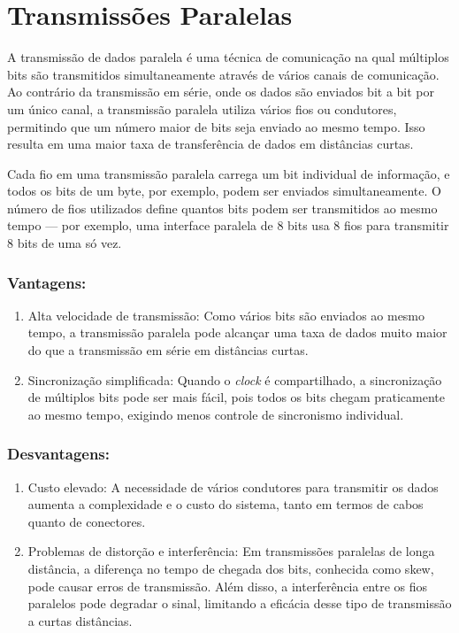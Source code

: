\documentclass[12pt]{article}
\begin{document}
\section{Transmissões Paralelas}
A transmissão de dados paralela é uma técnica de comunicação na qual múltiplos bits são transmitidos simultaneamente através de vários canais de comunicação. Ao contrário da transmissão em série, onde os dados são enviados bit a bit por um único canal, a transmissão paralela utiliza vários fios ou condutores, permitindo que um número maior de bits seja enviado ao mesmo tempo. Isso resulta em uma maior taxa de transferência de dados em distâncias curtas.

Cada fio em uma transmissão paralela carrega um bit individual de informação, e todos os bits de um byte, por exemplo, podem ser enviados simultaneamente. O número de fios utilizados define quantos bits podem ser transmitidos ao mesmo tempo — por exemplo, uma interface paralela de 8 bits usa 8 fios para transmitir 8 bits de uma só vez.

\subsubsection{Vantagens:}
\begin{enumerate}
    \item Alta velocidade de transmissão: Como vários bits são enviados ao mesmo tempo, a transmissão paralela pode alcançar uma taxa de dados muito maior do que a transmissão em série em distâncias curtas.
    \item Sincronização simplificada: Quando o \textit{\textit{clock}} é compartilhado, a sincronização de múltiplos bits pode ser mais fácil, pois todos os bits chegam praticamente ao mesmo tempo, exigindo menos controle de sincronismo individual.
\end{enumerate}

\subsubsection{Desvantagens:}
\begin{enumerate}
    \item Custo elevado: A necessidade de vários condutores para transmitir os dados aumenta a complexidade e o custo do sistema, tanto em termos de cabos quanto de conectores.
    \item Problemas de distorção e interferência: Em transmissões paralelas de longa distância, a diferença no tempo de chegada dos bits, conhecida como skew, pode causar erros de transmissão. Além disso, a interferência entre os fios paralelos pode degradar o sinal, limitando a eficácia desse tipo de transmissão a curtas distâncias.
\end{enumerate}
\end{document}
